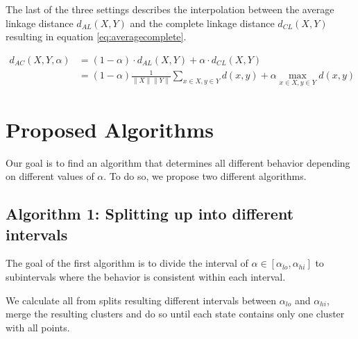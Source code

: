 The last of the three settings describes the interpolation between the average linkage distance $d_{AL}(X,Y)$ and the complete linkage distance $d_{CL}(X,Y)$ resulting in equation \ref{eq:averagecomplete}.

\begin{equation}
    \begin{aligned}
        d_{AC}(X,Y,\alpha) &= (1 - \alpha) \cdot d_{AL}(X,Y) + \alpha \cdot d_{CL}(X,Y)\\
        &= (1 - \alpha) \frac{1}{\|X\| \|Y\|}\sum\limits_{x \in X, y \in Y} d(x,y) + \alpha \max\limits_{x \in X, y \in Y} d(x,y)
    \end{aligned}
    \label{eq:averagecomplete}
\end{equation}


\section{Proposed Algorithms}

Our goal is to find an algorithm that determines all different behavior depending on different values of $\alpha$. To do so, we propose two different algorithms. 

\subsection{Algorithm 1: Splitting up into different intervals}

The goal of the first algorithm is to divide the interval of $\alpha \in [\alpha_{lo}, \alpha_{hi}]$ to subintervals where the behavior is consistent within each interval. 

\begin{algorithm}[H]
    \caption{We calculate all from splits resulting different intervals between $\alpha_{lo}$ and $\alpha_{hi}$, merge the resulting clusters and do so until each state contains only one cluster with all points.}
    \label{alg:alphalinkage1}
\end{algorithm}

